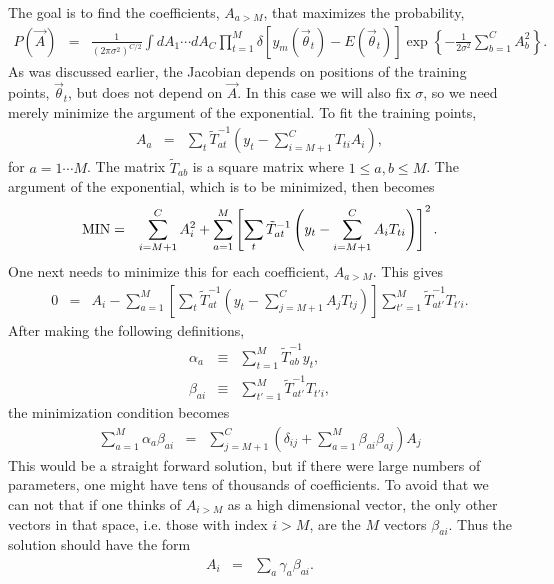 \documentclass[UserManual.tex]{subfiles}
\begin{document}
The goal is to find the coefficients, $A_{a>M}$, that maximizes the probability,
\begin{eqnarray}
P(\vec{A})&=&\frac{1}{(2\pi\sigma^2)^{C/2}}\int dA_1\cdots dA_C \prod_{t=1}^M\delta[y_m(\vec{\theta}_t)-E(\vec{\theta}_t)]
\exp\left\{
-\frac{1}{2\sigma^2}\sum_{b=1}^C A_b^2
\right\}.
\end{eqnarray}
As was discussed earlier, the Jacobian depends on positions of the training points,  $\vec{\theta}_t$, but does not depend on $\vec{A}$. In this case we will also fix $\sigma$, so we need merely minimize the argument of the exponential. To fit the training points,
\begin{eqnarray}
\label{eq:AofTA}
A_{a}&=&\sum_t \tilde{T}^{-1}_{at}\left(y_t-\sum_{i=M+1}^CT_{ti}A_i\right),
\end{eqnarray}
for $a=1\cdots M$. The matrix $\tilde{T}_{ab}$ is a square matrix where $1\le a,b\le M$. The argument of the exponential, which is to be minimized, then becomes
\begin{eqnarray}
{\rm MIN}&=&\sum_{i=M+1}^C A_i^2+\sum_{a=1}^M\left[\sum_t\tilde{T}^{-1}_{at}\left(y_t-\sum_{i=M+1}^CA_iT_{ti}\right)\right]^2.
\end{eqnarray}
One next needs to minimize this for each coefficient, $A_{a>M}$. This gives
\begin{eqnarray}
0&=&A_i
-\sum_{a=1}^M\left[\sum_t\tilde{T}^{-1}_{at}\left(y_t-\sum_{j=M+1}^CA_jT_{tj}\right)\right]
\sum_{t'=1}^M\tilde{T}_{at'}^{-1}T_{t'i}.
\end{eqnarray}
After making the following definitions,
\begin{eqnarray}
\alpha_a&\equiv&\sum_{t=1}^M\tilde{T}^{-1}_{ab}y_t,\\
\nonumber
\beta_{ai}&\equiv& \sum_{t'=1}^M\tilde{T}_{at'}^{-1}T_{t'i},
\end{eqnarray}
the minimization condition becomes
\begin{eqnarray}
\sum_{a=1}^M\alpha_a\beta_{ai}&=&\sum_{j=M+1}^C \left(\delta_{ij}+\sum_{a=1}^M\beta_{ai}\beta_{aj}\right)A_j
\end{eqnarray}
This would be a straight forward solution, but if there were large numbers of parameters, one might have tens of thousands of coefficients. To avoid that we can not that if one thinks of $A_{i>M}$ as a high dimensional vector, the only other vectors in that space, i.e. those with index $i>M$, are the $M$ vectors $\beta_{ai}$. Thus the solution should have the form
\begin{eqnarray}
\label{eq:AofGamma}
A_{i}&=&\sum_a\gamma_a \beta_{ai}.
\end{eqnarray}
\end{document}

